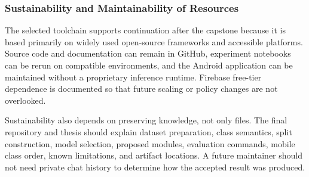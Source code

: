 \documentclass[12pt,a4paper]{report}
\begin{document}
\subsubsection{Sustainability and Maintainability of Resources}
The selected toolchain supports continuation after the capstone because it is based primarily on widely used open-source frameworks and accessible platforms. Source code and documentation can remain in GitHub, experiment notebooks can be rerun on compatible environments, and the Android application can be maintained without a proprietary inference runtime. Firebase free-tier dependence is documented so that future scaling or policy changes are not overlooked.\par
Sustainability also depends on preserving knowledge, not only files. The final repository and thesis should explain dataset preparation, class semantics, split construction, model selection, proposed modules, evaluation commands, mobile class order, known limitations, and artifact locations. A future maintainer should not need private chat history to determine how the accepted result was produced.\par
\end{document}
